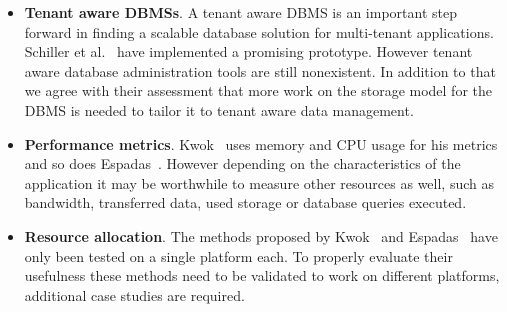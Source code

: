 \begin{itemize}
	\item \textbf{Tenant aware \acp{DBMS}}.
		A tenant aware \ac{DBMS} is an important step forward in finding a scalable database solution for multi-tenant applications.
		Schiller et al.~\cite{schiller2011native} have implemented a promising prototype. However tenant aware database administration tools are still nonexistent.
		In addition to that we agree with their assessment that more work on the storage model for the \ac{DBMS} is needed to tailor it to tenant aware data management.
	\item \textbf{Performance metrics}.
		Kwok~\cite{kwok2008resource} uses memory and CPU usage for his metrics and so does Espadas~\cite{espadas2013tenant}. 
		However depending on the characteristics of the application it may be worthwhile to measure other resources as well, such as bandwidth, transferred data, used storage or database queries executed. 
	\item \textbf{Resource allocation}.
		The methods proposed by Kwok~\cite{kwok2008resource} and Espadas~\cite{espadas2013tenant} have only been tested on a single platform each.
		To properly evaluate their usefulness these methods need to be validated to work on different platforms, additional case studies are required.
\end{itemize}

